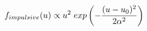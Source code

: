 \documentclass[12pt]{article}
\begin{document}
$$
	f_{impulsive}(u) \propto u^{2} \hspace{1mm} exp\left(-\frac{(u-u_0)^{2}}{2\alpha^2}\right) 
$$
\end{document}
